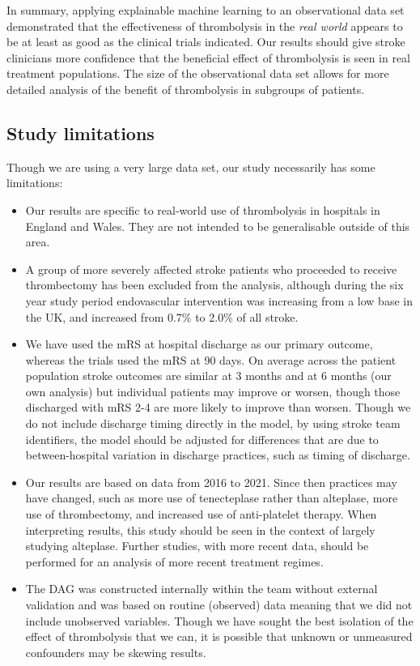 In summary, applying explainable machine learning to an observational data set demonstrated that the effectiveness of thrombolysis in the \textit{real world} appears to be at least as good as the clinical trials indicated. Our results should give stroke clinicians more confidence that the beneficial effect of thrombolysis is seen in real treatment populations. The size of the observational data set allows for more detailed analysis of the benefit of thrombolysis in subgroups of patients.

\subsection{Study limitations}

Though we are using a very large data set, our study necessarily has some limitations:

\begin{itemize}
    \item Our results are specific to real-world use of thrombolysis in hospitals in England and Wales. They are not intended to be generalisable outside of this area.
    \item A group of more severely affected stroke patients who proceeded to receive thrombectomy has been excluded from the analysis, although during the six year study period endovascular intervention was increasing from a low base in the UK, and increased from 0.7\% to 2.0\% of all stroke.
    \item We have used the mRS at hospital discharge as our primary outcome, whereas the trials used the mRS at 90 days. On average across the patient population stroke outcomes are similar at 3 months \cite{elhabr_predicting_2021} and at 6 months (our own analysis) but individual patients may improve or worsen, though those discharged with mRS 2-4 are more likely to improve than worsen. Though we do not include discharge timing directly in the model, by using stroke team identifiers, the model should be adjusted for differences that are due to between-hospital variation in discharge practices, such as timing of discharge.
    \item Our results are based on data from 2016 to 2021. Since then practices may have changed, such as more use of tenecteplase rather than alteplase, more use of thrombectomy, and increased use of anti-platelet therapy. When interpreting results, this study should be seen in the context of largely studying alteplase. Further studies, with more recent data,  should be performed for an analysis of more recent treatment regimes.
    \item The DAG was constructed internally within the team without external validation and was based on routine (observed) data meaning that we did not include unobserved variables. Though we have sought the best isolation of the effect of thrombolysis that we can, it is possible that unknown  or unmeasured confounders may be skewing results.

\end{itemize}

